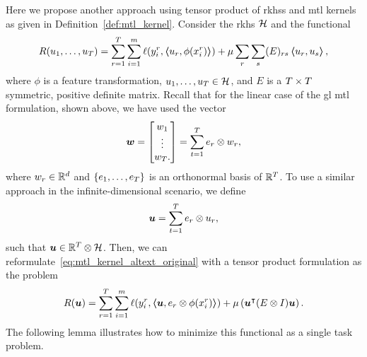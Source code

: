 Here we propose another approach using tensor product of \acrshort{rkhss} and \acrshort{mtl} kernels as given in Definition~\ref{def:mtl_kernel}. 
Consider the \acrshort{rkhs} $\mathcal{H}$ and the functional
\begin{equation}
    \label{eq:mtl_kernel_altext_original}
    \begin{aligned}
         & R({u_1, \ldots, u_T}) = \sum_{r=1}^{\ntasks} \sum_{i=1}^\npertask \lossf(y_i^r, \dotp{u_r}{\phi(x_i^r)}) + \mu \sum_r \sum_s (E)_{rs} \dotp{u_r}{u_s} , \\
    \end{aligned}
\end{equation}
where $\phi$ is a feature transformation, $u_1, \ldots, u_T \in \mathcal{H}$, and $E$ is a $T \times T$ symmetric, positive definite matrix.
%
Recall that for the linear case of the \acrshort{gl} \acrshort{mtl} formulation, shown above, we have used the vector
\begin{equation}
    \nonumber
    \bm{w} = 
    \begin{bmatrix}
        w_1 \\
        \vdots \\
        w_T .
    \end{bmatrix}
    = \sum_{t=1}^T e_r \otimes w_r ,
\end{equation}
where $w_r \in \mathbb{R}^d$ and $\left\{e_1, \ldots, e_T\right\}$ is an orthonormal basis of $\mathbb{R}^T$.
To use a similar approach in the infinite-dimensional scenario, we define
\begin{equation}
    \nonumber
    \bm{u} = \sum_{t=1}^T e_r \otimes u_r ,
\end{equation}
such that $\bm{u} \in \mathbb{R}^T \otimes \mathcal{H}$. Then, we can reformulate~\eqref{eq:mtl_kernel_altext_original} with a tensor product formulation as the problem
\begin{equation}
    \label{eq:mtl_kernel_altext_tensor}
    \begin{aligned}
            & R(\myvec{u}) = \sum_{r=1}^{\ntasks} \sum_{i=1}^\npertask \lossf(y_i^r, \dotp{\myvec{u}}{e_r \otimes \phi(x_i^r)}) + \mu \left(  \myvec{u}^\intercal (E \otimes I) \myvec{u} \right). \\
    \end{aligned}
\end{equation}
The following lemma illustrates how to minimize this functional as a single task problem.
